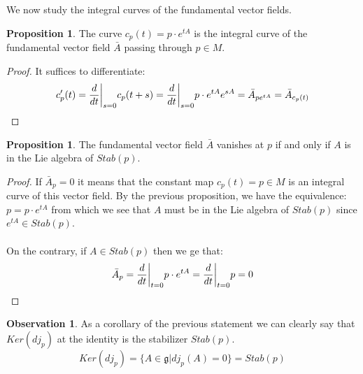 \documentclass[12pt,a4paper]{report}
\theoremstyle{definition}
\theoremstyle{Theorem}
\newtheorem{Prop}[Def]{Proposition}
\theoremstyle{definition}
\theoremstyle{definition}
\newtheorem{Obs}[Def]{Observation}
\begin{document}
	We now study the integral curves of the fundamental vector fields.
	\begin{Prop}
		The curve $c_p(t)=p\cdot e^{tA}$ is the integral curve of the fundamental vector field $\bar{A}$ passing through $p\in M$.
	\end{Prop}
	\begin{proof}
		It suffices to differentiate:
		$$c'_p(t)={d\over dt}\bigg|_{s=0}c_p(t+s)=
		{d\over dt}\bigg|_{s=0}p\cdot e^{tA}e^{sA}=\bar{A}_{pe^{tA}}=
		\bar{A}_{c_p(t)}$$
	\end{proof}
	\begin{Prop}
		The fundamental vector field $\bar{A}$ vanishes at $p$ if and only if $A$ is in the Lie algebra of $Stab(p)$.
	\end{Prop}
	\begin{proof}
		If $\bar{A}_p=0$ it means that the constant map $c_p(t)=p\in M$ is an integral curve of this vector field. By the previous proposition, we have the equivalence:
		$p=p\cdot e^{tA}$ from which we see that $A$ must be in the Lie algebra of $Stab(p)$ since $e^{tA}\in Stab(p)$.\\
		\\
		On the contrary, if $A\in Stab(p)$ then we ge that:
		$$\bar{A}_p={d\over dt}\bigg|_{t=0}p\cdot e^{tA}=
		{d\over dt}\bigg|_{t=0}p=0$$
	\end{proof}
	\begin{Obs}\label{Kerdj}
		As a corollary of the previous statement we can clearly say that $Ker(dj_p)$ at the identity is the stabilizer $Stab(p)$.
		$$Ker (dj_p)=\{A\in \mathfrak{g}|dj_p(A)=0\}=Stab(p)$$
	\end{Obs}
\end{document}
